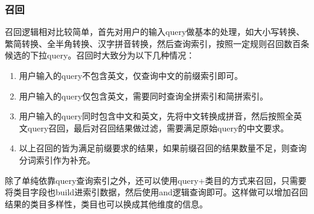 \subsubsection{召回}
召回逻辑相对比较简单，首先对用户的输入query做基本的处理，如大小写转换、繁简转换、全半角转换、汉字拼音转换，然后查询索引，按照一定规则召回数百条候选的下拉query。召回时大致分为以下几种情况：
\begin{enumerate}
\item 用户输入的query不包含英文，仅查询中文的前缀索引即可。
\item 用户输入的query仅包含英文，需要同时查询全拼索引和简拼索引。
\item 用户输入的query同时包含中文和英文，先将中文转换成拼音，然后按照全英文query召回，最后对召回结果做过滤，需要满足原始query的中文要求。
\item 以上召回的皆为满足前缀要求的结果，如果前缀召回的结果数量不足，则查询分词索引作为补充。
\end{enumerate}

除了单纯依靠query查询索引之外，还可以使用query+类目的方式来召回，只需要将类目字段也build进索引数据，然后使用and逻辑查询即可。这样做可以增加召回结果的类目多样性，类目也可以换成其他维度的信息。
